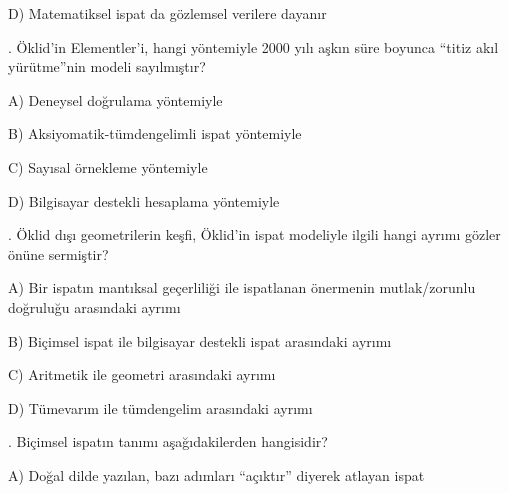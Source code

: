 \par\noindent\hspace*{1.6em}D) Matematiksel ispat da gözlemsel verilere dayanır

\par\smallskip{}. Öklid’in Elementler’i, hangi yöntemiyle 2000 yılı aşkın süre boyunca “titiz akıl yürütme”nin modeli sayılmıştır?

\par\noindent\hspace*{1.6em}A) Deneysel doğrulama yöntemiyle

\par\noindent\hspace*{1.6em}B) Aksiyomatik-tümdengelimli ispat yöntemiyle

\par\noindent\hspace*{1.6em}C) Sayısal örnekleme yöntemiyle

\par\noindent\hspace*{1.6em}D) Bilgisayar destekli hesaplama yöntemiyle

\par\smallskip{}. Öklid dışı geometrilerin keşfi, Öklid’in ispat modeliyle ilgili hangi ayrımı gözler önüne sermiştir?

\par\noindent\hspace*{1.6em}A) Bir ispatın mantıksal geçerliliği ile ispatlanan önermenin mutlak/zorunlu doğruluğu arasındaki ayrımı

\par\noindent\hspace*{1.6em}B) Biçimsel ispat ile bilgisayar destekli ispat arasındaki ayrımı

\par\noindent\hspace*{1.6em}C) Aritmetik ile geometri arasındaki ayrımı

\par\noindent\hspace*{1.6em}D) Tümevarım ile tümdengelim arasındaki ayrımı

\par\smallskip{}. Biçimsel ispatın tanımı aşağıdakilerden hangisidir?

\par\noindent\hspace*{1.6em}A) Doğal dilde yazılan, bazı adımları “açıktır” diyerek atlayan ispat

